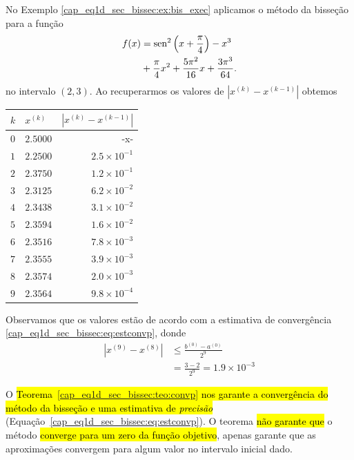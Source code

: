\begin{ex}\label{cap_eq1d_sec_bissec:ex:bis_convp}
  No Exemplo \ref{cap_eq1d_sec_bissec:ex:bis_exec} aplicamos o método da bisseção para a função
  \begin{equation}
    \begin{aligned}
      f(x) &= \operatorname{sen}^2\left(x+\frac{\pi}{4}\right) - x^3 \\
           &+ \frac{\pi}{4}x^2 + \frac{5\pi^2}{16}x + \frac{3\pi^3}{64}.
    \end{aligned}
\end{equation}
no intervalo $(2, 3)$. Ao recuperarmos os valores de $\left|x^{(k)}-x^{(k-1)}\right|$ obtemos
\begin{center}
  \begin{tabular}[H]{l|l|r}
    $k$ & $x^{(k)}$ & $\left|x^{(k)}-x^{(k-1)}\right|$\\\hline
    $0$ & $2.5000$ & -x-\\
    $1$ & $2.2500$ & $2.5\times 10^{-1}$\\
    $2$ & $2.3750$ & $1.2\times 10^{-1}$\\
    $3$ & $2.3125$ & $6.2\times 10^{-2}$\\
    $4$ & $2.3438$ & $3.1\times 10^{-2}$\\
    $5$ & $2.3594$ & $1.6\times 10^{-2}$\\
    $6$ & $2.3516$ & $7.8\times 10^{-3}$\\
    $7$ & $2.3555$ & $3.9\times 10^{-3}$\\
    $8$ & $2.3574$ & $2.0\times 10^{-3}$\\
    $9$ & $2.3564$ & $9.8\times 10^{-4}$\\\hline
  \end{tabular}
\end{center}

Observamos que os valores estão de acordo com a estimativa de convergência \ref{cap_eq1d_sec_bissec:eq:estconvp}, donde
\begin{align}
  |x^{(9)}-x^{(8)}| &\leq \frac{b^{(0)}-a^{(0)}}{2^{9}}\\
                     &= \frac{3 - 2}{2^{9}} = 1.9\times 10^{-3}
\end{align}
\end{ex}

O \hl{Teorema~{\ref{cap_eq1d_sec_bissec:teo:convp}} nos garante a convergência do método da bisseção e uma estimativa de \emph{precisão}} (Equação~\ref{cap_eq1d_sec_bissec:eq:estconvp}). O teorema \hl{não garante que} o método \hl{converge para um zero da função objetivo}, apenas garante que as aproximações convergem para algum valor no intervalo inicial dado.

